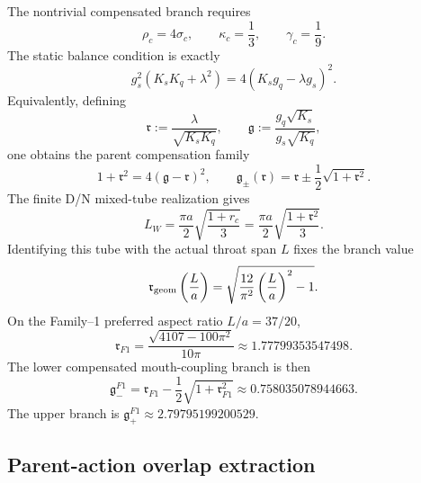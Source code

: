 The nontrivial compensated branch requires
\begin{equation}
\label{eq:app-part04-core-canonical-conditions}
\rho_c=4\sigma_c,
\qquad
\kappa_c=\frac13,
\qquad
\gamma_c=\frac19.
\end{equation}
The static balance condition is exactly
\begin{equation}
\label{eq:app-part04-core-coupling-balance}
g_s^2(K_sK_q+\lambda^2)
=
4(K_sg_q-\lambda g_s)^2.
\end{equation}
Equivalently, defining
\begin{equation}
\label{eq:app-part04-r-g-parent-ratios}
\mathfrak r:=\frac{\lambda}{\sqrt{K_sK_q}},
\qquad
\mathfrak g:=\frac{g_q\sqrt{K_s}}{g_s\sqrt{K_q}},
\end{equation}
one obtains the parent compensation family
\begin{equation}
\label{eq:app-part04-parent-compensation-family}
1+\mathfrak r^2=4(\mathfrak g-\mathfrak r)^2,
\qquad
\mathfrak g_\pm(\mathfrak r)=\mathfrak r\pm\frac12\sqrt{1+\mathfrak r^2}.
\end{equation}
The finite D/N mixed-tube realization gives
\begin{equation}
\label{eq:app-part04-LW-compensation}
L_W=\frac{\pi a}{2}\sqrt{\frac{1+r_c}{3}}
=\frac{\pi a}{2}\sqrt{\frac{1+\mathfrak r^2}{3}}.
\end{equation}
Identifying this tube with the actual throat span \(L\) fixes the branch value
\begin{equation}
\label{eq:app-part04-r-geom}
\mathfrak r_{\rm geom}\left(\frac La\right)
=
\sqrt{\frac{12}{\pi^2}\left(\frac La\right)^2-1}.
\end{equation}
On the Family--1 preferred aspect ratio \(L/a=37/20\),
\begin{equation}
\label{eq:app-part04-rF1}
\mathfrak r_{F1}
=
\frac{\sqrt{4107-100\pi^2}}{10\pi}
\approx1.77799353547498.
\end{equation}
The lower compensated mouth-coupling branch is then
\begin{equation}
\label{eq:app-part04-gminus-F1}
\mathfrak g_-^{F1}
=
\mathfrak r_{F1}-\frac12\sqrt{1+\mathfrak r_{F1}^2}
\approx0.758035078944663.
\end{equation}
The upper branch is \(\mathfrak g_+^{F1}\approx2.79795199200529\).

\subsection{Parent-action overlap extraction}
\label{subsec:app-part04-parent-overlap-extraction}

